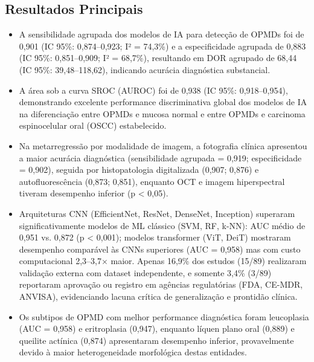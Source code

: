 \subsection{Resultados Principais}
\begin{itemize}
  \item A sensibilidade agrupada dos modelos de IA para detecção de
        OPMDs foi de 0,901 (IC 95\%: 0,874--0,923; I² = 74,3\%) e
        a especificidade agrupada de 0,883 (IC 95\%: 0,851--0,909;
        I² = 68,7\%), resultando em DOR agrupado de 68,44
        (IC 95\%: 39,48--118,62), indicando acurácia diagnóstica
        substancial.
  \item A área sob a curva SROC (AUROC) foi de 0,938
        (IC 95\%: 0,918--0,954), demonstrando excelente performance
        discriminativa global dos modelos de IA na diferenciação
        entre OPMDs e mucosa normal e entre OPMDs e carcinoma
        espinocelular oral (OSCC) estabelecido.
  \item Na metarregressão por modalidade de imagem, a fotografia
        clínica apresentou a maior acurácia diagnóstica (sensibilidade
        agrupada = 0,919; especificidade = 0,902), seguida por
        histopatologia digitalizada (0,907; 0,876) e autofluorescência
        (0,873; 0,851), enquanto OCT e imagem hiperspectral tiveram
        desempenho inferior (p < 0,05).
  \item Arquiteturas CNN (EfficientNet, ResNet, DenseNet, Inception)
        superaram significativamente modelos de ML clássico (SVM, RF,
        k-NN): AUC médio de 0,951 vs. 0,872 (p < 0,001); modelos
        transformer (ViT, DeiT) mostraram desempenho comparável às
        CNNs superiores (AUC = 0,958) mas com custo computacional
        2,3--3,7$\times$ maior.
  \imiento Apenas 16,9\% dos estudos (15/89) realizaram validação externa
        com dataset independente, e somente 3,4\% (3/89) reportaram
        aprovação ou registro em agências regulatórias (FDA, CE-MDR,
        ANVISA), evidenciando lacuna crítica de generalização e
        prontidão clínica.
  \item Os subtipos de OPMD com melhor performance diagnóstica foram
        leucoplasia (AUC = 0,958) e eritroplasia (0,947), enquanto
        líquen plano oral (0,889) e queilite actínica (0,874)
        apresentaram desempenho inferior, provavelmente devido à maior
        heterogeneidade morfológica destas entidades.
\end{itemize}

